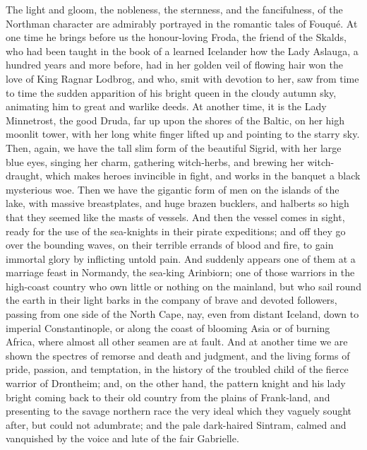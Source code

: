 The light and gloom, the
nobleness, the sternness, and the fancifulness, of the Northman
character are admirably portrayed in the romantic tales of Fouqué. At
one time he brings before us the honour-loving Froda, the friend of
the Skalds, who had been taught in the book of a learned
Icelander how the Lady Aslauga, a hundred years and more before, had
in her golden veil of flowing hair won the love of King Ragnar Lodbrog,
and who, smit with devotion to her, saw from time to time the sudden
apparition of his bright queen in the cloudy autumn sky, animating him
to great and warlike deeds. At another time, it is the Lady Minnetrost,
the good Druda, far up upon the shores of the Baltic, on her high
moonlit tower, with her long white finger lifted up and pointing to
the starry sky. Then, again, we have the tall slim form of the
beautiful Sigrid, with her large blue eyes, singing her charm,
gathering witch-herbs, and brewing her witch-draught, which makes
heroes invincible in fight, and works in the banquet a black
mysterious woe. Then we have the gigantic form of men on the islands
of the lake, with massive breastplates, and huge brazen bucklers, and
halberts so high that they seemed like the masts of vessels. And then
the vessel comes in sight, ready for the use of the sea-knights in
their pirate expeditions; and off they go over the bounding waves, on
their terrible errands of blood and fire, to gain immortal glory by
inflicting untold pain. And suddenly appears one of them at a marriage
feast in Normandy, the sea-king Arinbiorn; one of those warriors in
the high-coast country who own little or nothing on the mainland, but
who sail round the earth in their light barks in the company of brave
and devoted followers, passing from one side of the North Cape, nay,
even from distant Iceland, down to imperial Constantinople, or along
the coast of blooming Asia or of burning Africa, where almost all
other seamen are at fault. And at another time we are shown the
spectres of remorse and death and judgment, and the living forms of
pride, passion, and temptation, in the history of the troubled child
of the fierce warrior of Drontheim; and, on the other hand, the
pattern knight and his lady bright coming back to their old country
from the plains of Frank-land, and presenting to the savage northern
race the very ideal which they vaguely sought after, but could not
adumbrate; and the pale dark-haired Sintram, calmed and vanquished by
the voice and lute of the fair Gabrielle.

